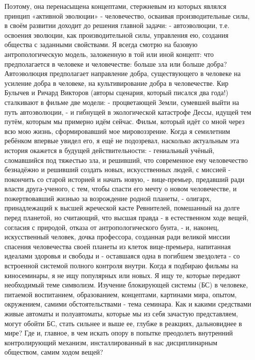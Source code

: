Поэтому, она перенасыщена концептами, стержневым из которых являлся принцип «активной эволюции» - человечество, осваивая производительные силы, в своём развитии доходит до решения главной задачи:
- автоэволюции, т.е. освоения эволюции, как производительной силы, управления ею, создания общества с заданными свойствами.
Я всегда смотрю на базовую антропологическую модель, заложенную в той или иной концепт: что предполагается в человеке и человечестве: больше зла или больше добра?
Автоэволюция предполагает направление добра, существующего в человеке на усиление добра в человеке, на культивирование добра в человечестве.
Кир Булычев и Ричард Викторов (авторы сценария, который писался два года!) сталкивают в фильме две модели:
- процветающей Земли, сумевшей выйти на путь автоэволюции,
- и гибнущей в экологической катастрофе Дессы, идущей тем путём, которым мы примерно идём сейчас. 
Фильм, который идёт со мной через всю мою жизнь, сформировавший мое мировоззрение.
Когда я семилетним ребёнком впервые увидел его, я ещё не подозревал, насколько актуальным эта история окажется в будущей действительности:
- гениальный учёный, сломавшийся под тяжестью зла, и решивший, что современное ему человечество безнадёжно и решивший создать новых, искусственных людей, с миссией - покончить со старой историей и начать новую,
-  вице-премьер, предавший ради власти друга-ученого, с тем, чтобы спасти его мечту о новом человечестве, и пожертвовавший жизнью за возрождение родной планеты,
- олигарх, принадлежащий к высшей жреческой касте Ревнителей, помешанный на долге перед планетой, но считающий, что высшая правда - в естественном ходе вещей, согласия с природой, отказа от антропологического бунта,
- и, наконец, искусственный человек, дочка профессора, созданная ради великой миссии спасения человечества своей планеты из клеток вице-премьера, напитанная идеалами здоровья и свободы и - оставшаяся одна в погибшем звездолета - со встроенной системой полного контроля внутри. 
Когда я подбираю фильмы на киносеминары, я не ищу популярных или новых.
Я ищу те, которые передают необходимый теме символизм.
Изучение блокирующей системы (БС) в человеке, питаемой воспитанием, образованием, концептами, картинами мира, опытом, окружением, самими обстоятельствами - тема семинара.
Как и какими средствами живые автоматы и полуавтоматы, которые мы из себя зачастую представляем, могут обойти БС, стать сильнее и выше ее, глубже в реакциях, дальновиднее в мире?
Где и, главное, в чем искать опору в попытке преодолеть внутренний контролирующий механизм, инсталлированный в нас дисциплинарным обществом, самим ходом вещей?
